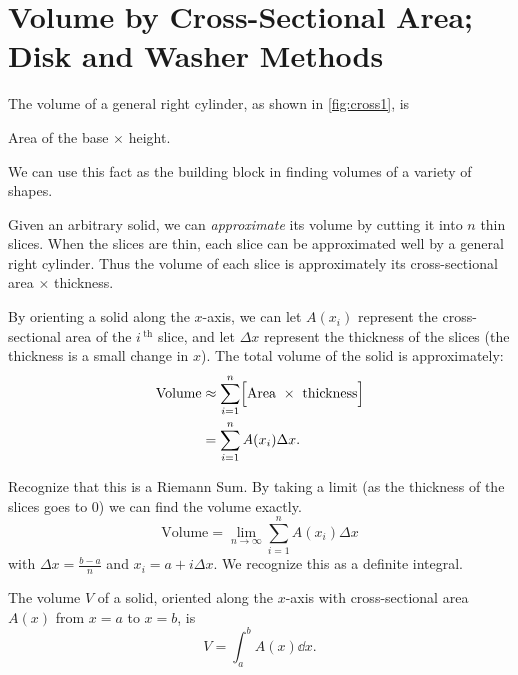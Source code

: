 \section[Volume by Cross-Sectional Area; Disk and Washer Methods]{Volume by Cross-Sectional Area;\\Disk and Washer Methods}\label{sec:disk}

The volume of a general right cylinder, as shown in \autoref{fig:cross1}, is 
\begin{center}
Area of the base $\times$ height.
\end{center}
We can use this fact as the building block in finding volumes of a variety of shapes.

Given an arbitrary solid, we can \emph{approximate} its volume by cutting it into $n$  thin slices. When the slices are thin, each slice can be approximated well by a general right cylinder. Thus the volume of each slice is approximately its cross-sectional area $\times$ thickness.

By orienting a solid along the $x$-axis, we can let $A(x_i)$ represent the cross-sectional area
of the $i\,^\text{th}$ slice, and let $\Delta x$ represent the thickness of the slices (the thickness is a small change in $x$). The total volume of the solid is approximately:
	\begin{align*} \text{Volume} &\approx \sum_{i=1}^n \Bigl[\text{Area}\ \times\ \text{thickness}\Bigr] \\
			&= \sum_{i=1}^n A(x_i)\Delta x.
	\end{align*}
	
Recognize that this is a Riemann Sum. By taking a limit (as the thickness of the slices goes to 0) we can find the volume exactly. 
\[\text{Volume}=\lim_{n\to \infty} \sum_{i=1}^n A(x_i)\Delta x\]
with $\Delta x=\frac{b-a}{n}$ and $x_i=a+i\Delta x$. We recognize this as a definite integral.

\begin{theorem}\label{thm:volume_by_cross_section}
The volume $V$ of a solid, oriented along the $x$-axis with cross-sectional area $A(x)$ from $x=a$ to $x=b$, is 
\[V = \int_a^b A(x)\dd x.\]
\end{theorem}

